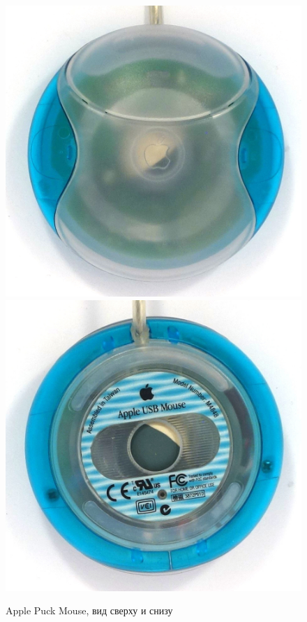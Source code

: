 \documentclass[11pt, a4paper]{article}
\begin{document}
\begin{figure}[h]
    \centering
    \includegraphics[scale=0.6]{1998_apple_puck/appleup60.jpg}
    \includegraphics[scale=0.6]{1998_apple_puck/appledown60.jpg}
    \caption{Apple Puck Mouse, вид сверху и снизу}
    \label{fig:top}
\end{figure}
\end{document}
